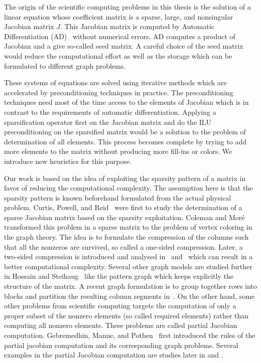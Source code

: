 \documentclass[12pt, twoside,a4paper,toc=bibliography]{scrbook}
\begin{document}
The origin of the scientific computing problems in this thesis is the solution of a linear equation whose coefficient matrix is a sparse, large, and nonsingular Jacobian matrix $J$. 
This Jacobian matrix is computed by Automatic Differentiation (AD)~\cite{Griewank2008EDP,Rall1981ADT} without numerical errors.
AD computes a product of Jacobian and a give so-called seed matrix.
A careful choice of the seed matrix would reduce the computational effort as well as 
the storage which can be formulated to different graph problems.

These systems of equations are solved using iterative methods which are accelerated by preconditioning techniques in practice.
The preconditioning techniques need most of the time access to
the elements of Jacobian which is in contrast to the requirements of automatic differentiation.
Applying a sparsification operator first on the Jacobian matrix and do the ILU preconditioning
on the sparsified matrix would be a solution to the problem of determination of
all elements. This process becomes complete by trying to add more elements to the matrix
without producing more fill-ins or colors. We introduce new heuristics for this purpose.

Our work is based on the idea of exploiting the sparsity pattern of a matrix in favor of 
reducing the computational complexity. The assumption here is that the sparsity pattern is
known beforehand formulated from the actual physical problem.
Curtis, Powell, and Reid~\cite{Curtis1974117} were first to study the determination of 
a sparse Jacobian matrix based on the sparsity exploitation.
Coleman and Mor{\'e}~\cite{Coleman1983EoS} transformed this problem in a sparse matrix
to the problem of vertex coloring in the graph theory. The idea is to formulate
the compression of the columns such that all the nonzeros are survived, so called
a one-sided compression.
Later, a two-sided compression is introduced and analysed in~\cite{Coleman1996SaE}
and~\cite{hs:csj} which can result in a better computational complexity.
Several other graph models are studied further in Hossain and Steihaug~\cite{hs:gmei} 
like the pattern graph which keeps explicitly the structure of the matrix.
A recent graph formulation is to group together rows into blocks 
and partition the resulting column segments in~\cite{optimal_diret_determination}.
On the other hand, some other problems from scientific computing targets the computation
of only a proper subset of the nonzero elements (so called required elements)
rather than computing all nonzero elements.
These problems are called partial Jacobian computation.
Gebremedhin, Manne, and Pothen~\cite{Gebremedhin05whatcolor} first introduced
the rules of the partial jacobian computation and its corresponding graph problems. 
Several examples in the partial Jacobian computation are studies later in
\cite{CalotoiuMaster} and \cite{LulfesmannMaster}. 
\end{document}
